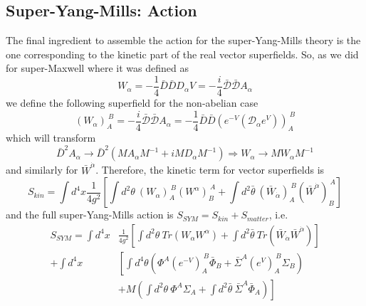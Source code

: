 \documentclass[a4paper,12pt]{article}
\numberwithin{equation}{section}
\numberwithin{exe}{section}
\newcommand{\Db}{{\bar D}}
\newcommand{\Dc}{{\mathcal D}}
\newcommand{\Dcb}{{\bar{\mathcal D}}}
\newcommand{\Wb}{{\bar W}}
\renewcommand{\a}{{\alpha}}
\newcommand{\ad}{{\dot\alpha}}
\renewcommand{\S}{{\Sigma}}
\newcommand{\Sb}{{\bar\Sigma}}
\renewcommand{\t}{{\theta}}
\newcommand{\tb}{{\bar\theta}}
\newcommand{\Phib}{{\bar \Phi}}
\begin{document}
\subsection{Super-Yang-Mills: Action}
The final ingredient to assemble the action for the super-Yang-Mills theory is the one corresponding to the kinetic part of the real vector superfields. So, as we did for super-Maxwell where it was defined as
	\begin{equation}
	W_\a = -\frac14 \Db\Db D_\a V = - \frac{i}{4} \Dcb\Dcb A_\a
	\end{equation}
we define the following superfield for the non-abelian case
	\begin{equation}
	(W_\a)_A^{\ B} = -\frac{i}{4} \Dcb\Dcb A_\a = -\frac14 \Db\Db (e^{-V} (\Dc_\a e^{V}))_A^{\ B}
	\end{equation}
which will transform
	\begin{equation}
	\Db^2 A_\a \rightarrow \Db^2(M A_\a M^{-1} + i M D_\a M^{-1}) \Longrightarrow W_\a \rightarrow M W_\a M^{-1}
	\end{equation}
and similarly for $\Wb^\ad$. Therefore, the kinetic term for vector superfields is
	\begin{equation}
	S_{kin} = \int d^4 x \frac{1}{4g^2}\left[\int d^2\t\ (W_\a)_A^{\ B} (W^\a)_B^{\ A} + \int d^2\tb\ (\Wb_\ad)_A^{\ B} (\Wb^\ad)_B^{\ A} \right]
	\end{equation}
and the full super-Yang-Mills action is $S_{SYM} = S_{kin} + S_{matter}$, i.e. 
	\begin{align}
	S_{SYM} = \int d^4 x & \frac{1}{4g^2}\left[\int  d^2\t \ Tr(W_\a W^\a) + \int d^2\tb\ Tr(\Wb_\ad \Wb^\ad) \right] \nonumber \\
	+ \int d^4 x  & \left[  \int d^4\t \left( \Phi^A(e^{-V})_A^{\ B}\Phib_B + \Sb^A(e^V)_A^{\ B}\S_B \right) \right. \nonumber \\
	& \left. + M \left(\int d^2\t\ \Phi^A\S_A + \int d^2\tb\ \Sb^A \Phib_A\right)\right]
	\end{align}
\end{document}
